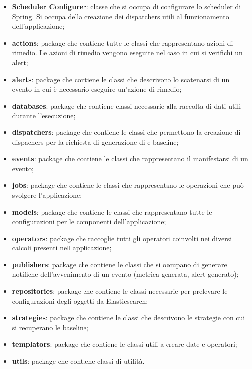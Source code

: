     \begin{itemize}
    	\item \textbf{Scheduler Configurer}: classe che si occupa di configurare lo scheduler di Spring. Si occupa della
    	creazione dei dispatchers utili al funzionamento dell'applicazione;
    	\item \textbf{actions}: package che contiene tutte le classi che rappresentano azioni di rimedio. Le azioni di
    	rimedio vengono eseguite nel caso in cui si verifichi un alert;
    	\item \textbf{alerts}: package che contiene le classi che descrivono lo scatenarsi di un evento in cui è necessario
    	eseguire un'azione di rimedio;
    	\item \textbf{databases}: package che contiene classi necessarie alla raccolta di dati utili durante l'esecuzione;
    	\item \textbf{dispatchers}: package che contiene le classi che permettono la creazione di dispachers per la
    	richiesta di generazione di  e baseline;
    	\item \textbf{events}: package che contiene le classi che rappresentano il manifestarsi di un evento;
    	\item \textbf{jobs}: package che contiene le classi che rappresentano le operazioni che può svolgere l'applicazione;
    	\item \textbf{models}: package che contiene le classi che rappresentano tutte le configurazioni per le componenti
    	dell'applicazione;
    	\item \textbf{operators}: package che raccoglie tutti gli operatori coinvolti nei diversi calcoli presenti
    	nell'applicazione;
    	\item \textbf{publishers}: package che contiene le classi che si occupano di generare notifiche dell'avvenimento
    	di un evento (metrica generata, alert generato);
    	\item \textbf{repositories}:  package che contiene le classi necessarie per prelevare le configurazioni degli oggetti
    	da Elasticsearch;
    	\item \textbf{strategies}: package che contiene le classi che descrivono le strategie con cui si recuperano le baseline;
    	\item \textbf{templators}: package che contiene le classi utili a creare date e operatori;
    	\item \textbf{utils}: package che contiene classi di utilità.
    \end{itemize}
